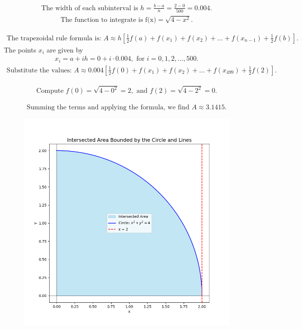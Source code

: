 \documentclass[journal]{IEEEtran}
\begin{document}
\begin{align}
\text{The width of each subinterval is } h = \frac{b - a}{n} = \frac{2 - 0}{500} = 0.004.
\end{align}
\begin{align}
\text{The function to integrate is f(x)} = \sqrt{4 - x^2}.
\end{align}

\begin{align}
\text{The trapezoidal rule formula is: } A \approx h \left[ \frac{1}{2} f(a) + f(x_1) + f(x_2) + \dots + f(x_{n-1}) + \frac{1}{2} f(b) \right].
\end{align}
The points  $x_i$  are given by
\begin{align}
  x_i = a + i h = 0 + i \cdot 0.004, \text{ for } i = 0, 1, 2, \dots, 500.
\end{align}
\begin{align}
\text{Substitute the values: } A \approx 0.004 \left[ \frac{1}{2} f(0) + f(x_1) + f(x_2) + \dots + f(x_{499}) + \frac{1}{2} f(2) \right].
\end{align}

\begin{align}
\text{Compute } f(0) = \sqrt{4 - 0^2} = 2, \text{ and } f(2) = \sqrt{4 - 2^2} = 0.
\end{align}

\begin{align}
\text{Summing the terms and applying the formula, we find } A \approx 3.1415.
\end{align}
\begin{figure}[h!]
   \centering
   \includegraphics[width=\columnwidth]{figs/Fig1.png}
\end{figure}
\end{document}
